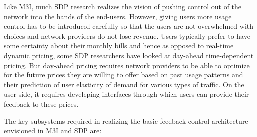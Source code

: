Like M3I, much SDP research realizes the vision of pushing control out of the network into the hands of the end-users. However, giving users more usage control has to be introduced carefully so that the users are not overwhelmed with choices and network providers do not lose revenue. Users typically prefer to have some certainty about their monthly bills and hence as opposed to real-time dynamic pricing, some SDP researchers have looked at day-ahead time-dependent pricing. But day-ahead pricing requires network providers to be able to optimize for the future prices they are willing to offer based on past usage patterns and their prediction of user elasticity of demand for various types of traffic. On the user-side, it requires developing interfaces through which users can provide their feedback to these prices. 

The key subsystems required in realizing the basic feedback-control architecture envisioned in M3I \cite{M3I} and SDP are:
